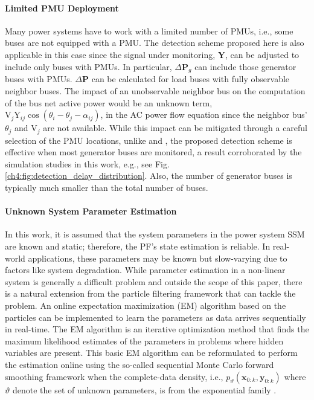 \paragraph{Limited PMU Deployment}
Many power systems have to work with a limited number of PMUs, i.e., some buses are not equipped with a PMU. The detection scheme proposed here is also applicable in this case since the signal under monitoring, $\boldsymbol{Y}$, can be adjusted to include only buses with PMUs. In particular, $\Delta\textbf{P}_{g}$ can include those generator buses with PMUs. $\Delta\textbf{P}$ can be calculated for load buses with fully observable neighbor buses. The impact of an unobservable neighbor bus on the computation of the bus net active power would be an unknown term, $\text{V}_j \text{Y}_{ij} \cos (\theta_i - \theta_j - \alpha_{ij})$, in the AC power flow equation since the neighbor bus' $\theta_j$ and $\text{V}_j$ are not available. While this impact can be mitigated through a careful selection of the PMU locations, unlike \cite{Chen2016} and \cite{yang2020control}, the proposed detection scheme is effective when most generator buses are monitored, a result corroborated by the simulation studies in this work, e.g., see Fig. \ref{ch4:fig:detection_delay_distribution}. Also, the number of generator buses is typically much smaller than the total number of buses.

\paragraph{Unknown System Parameter Estimation}
In this work, it is assumed that the system parameters in the power system SSM are known and static; therefore, the PF's state estimation is reliable. In real-world applications, these parameters may be known but slow-varying due to factors like system degradation. While parameter estimation in a non-linear system is generally a difficult problem and outside the scope of this paper, there is a natural extension from the particle filtering framework that can tackle the problem. An online expectation maximization (EM) algorithm based on the particles can be implemented to learn the parameters as data arrives sequentially in real-time. The EM algorithm is an iterative optimization method that finds the maximum likelihood estimates of the parameters in problems where hidden variables are present\cite{dempster1977maximum}. This basic EM algorithm can be reformulated to perform the estimation online using the so-called sequential Monte Carlo forward smoothing framework when the complete-data density, i.e., $p_\vartheta(\boldsymbol{x}_{0:k}, {\boldsymbol{y}}_{0:k})$ where $\vartheta$ denote the set of unknown parameters, is from the exponential family \cite{yildirim2013online}.


